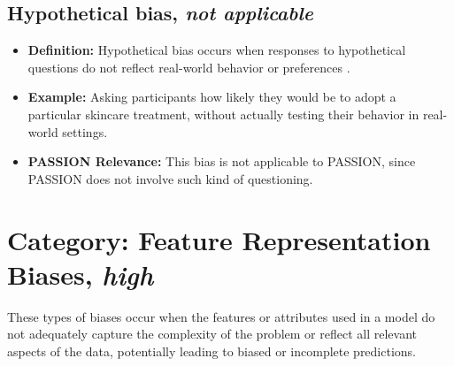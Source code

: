 \documentclass[12pt, a4paper, oneside]{book}   	%
\begin{document}
\begin{appendices}
		\subsection{Hypothetical bias, \textit{not applicable}}
		\begin{itemize}
			\item \textbf{Definition:} Hypothetical bias occurs when responses to hypothetical questions do not reflect real-world behavior or preferences \autocite{Chakraborty_2024, c31, c28}.
			\item \textbf{Example:} Asking participants how likely they would be to adopt a particular skincare treatment, without actually testing their behavior in real-world settings.
			\item \textbf{PASSION Relevance:} This bias is not applicable to PASSION, since PASSION does not involve such kind of questioning.
		\end{itemize}
		
		
		\section{Category: Feature Representation Biases, \textit{high}} \label{app:biasCategoryFeatureRepresentationBiasesHigh}
		These types of biases occur when the features or attributes used in a model do not adequately capture the complexity of the problem or reflect all relevant aspects of the data, potentially leading to biased or incomplete predictions.
		

\end{appendices}
\end{document}
